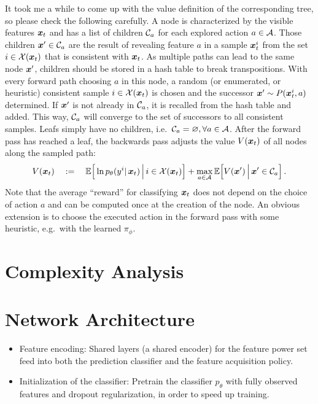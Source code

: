 It took me a while to come up with the value definition
of the corresponding tree, so please check the following carefully.
A node is characterized by the visible features $\bm x_t$
and has a list of children $\mathcal{C}_a$ for each explored action $a \in \mathcal{A}$. 
Those children $\bm x' \in \mathcal{C}_a$ 
are the result of revealing feature $a$ 
in a sample $\bm x^i_t$ from the set $i \in \mathcal{X}(\bm x_t)$
that is consistent with $\bm x_t$. 
As multiple paths can lead to the same node $\bm x'$,
children should be stored in a hash table to break transpositions.
With every forward path choosing $a$ in this node, 
a random (or enumerated, or heuristic) 
consistent sample $i \in \mathcal{X}(\bm x_t)$ is chosen
and the successor $\bm x' \sim P(\bm x^i_t, a)$ determined. 
If $\bm x'$ is not already in $\mathcal{C}_a$,
it is recalled from the hash table and added. 
This way, $\mathcal{C}_a$ will converge to the set of 
successors to all consistent samples.
Leafs simply have no children, 
i.e.~$\mathcal{C}_a = \varnothing, \forall a \in \mathcal{A}$.
After the forward pass has reached a leaf,
the backwards pass adjusts the value $V(\bm x_t)$
of all nodes along the sampled path: 
\begin{align}
	V(\bm x_t) \quad := \quad 
	\mathbb{E}\Big[\ln p_\theta(y^i |\, \bm x_{t}) 
		\,\Big|\, i \in \mathcal{X}(\bm x_t) \Big]
	+
	\max_{a \in \mathcal{A}} 
	\mathbb{E}\Big[ V(\bm x') \,\Big|\,	\bm x' \in \mathcal{C}_a	\Big]  \,.
\end{align}
Note that the average ``reward'' for classifying $\bm x_t$
does not depend on the choice of action $a$
and can be computed once at the creation of the node.
An obvious extension is to choose the executed action
in the forward pass with some heuristic,
e.g.~with the learned $\pi_\phi$. 

\section{Complexity Analysis}


\section{Network Architecture}
\begin{itemize}
\item
Feature encoding: Shared layers (a shared encoder) for the feature power set feed into both the prediction classifier and the feature acquisition policy.
\item
Initialization of the classifier: Pretrain the classifier $p_\theta$ with fully observed features and dropout regularization, in order to speed up training.
\end{itemize}


\def\FormatName#1{#1}

{\footnotesize}


